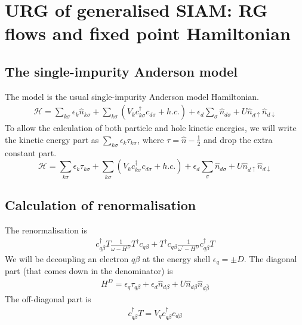 \chapter{URG of generalised SIAM: RG flows and fixed point Hamiltonian}\label{siamurg}
\section{The single-impurity Anderson model}
The model is the usual single-impurity Anderson model Hamiltonian.
\begin{equation}\begin{aligned}
	\label{andham}
	\mathcal{H} = \sum_{k\sigma}\epsilon_k \hat n_{k\sigma} + \sum_{k\sigma} \left(V_{k} c^\dagger_{k\sigma} c_{d\sigma} + h.c.\right) + \epsilon_{d}\sum_\sigma  \hat n_{d\sigma} +  U \hat n_{d\uparrow} \hat n_{d\downarrow}
\end{aligned}\end{equation}
To allow the calculation of both particle and hole kinetic energies, we will write the kinetic energy part as \(\sum_{k\sigma}\epsilon_k \tau_{k\sigma}\), where \(\tau = \hat n - \frac{1}{2}\) and drop the extra constant part.
\begin{equation}
	\label{model:siam}
	\mathcal{H} = \sum_{k\sigma}\epsilon_k \tau_{k\sigma} + \sum_{k\sigma} \left(V_{k} c^\dagger_{k\sigma} c_{d\sigma} + h.c.\right) + \epsilon_{d}\sum_\sigma  \hat n_{d\sigma} +  U \hat n_{d\uparrow} \hat n_{d\downarrow}
\end{equation}
\section{Calculation of renormalisation}
The renormalisation is
\begin{equation}\begin{aligned}
\label{newh}
c^\dagger_{q\beta}T \frac{1}{\omega - H^D}T^\dagger c_{q\beta} + T^\dagger c_{q\beta}\frac{1}{\omega^\prime - H^D}c^\dagger_{q\beta}T
\end{aligned}\end{equation}
We will be decoupling an electron \(q\beta\) at the energy shell \(\epsilon_q = \pm D\). The diagonal part (that comes down in the denominator) is
\begin{equation}\begin{aligned}
	\label{term1}
H^D = \epsilon_q \tau_{q\beta} + \epsilon_{d}\hat n_{d\beta} +  U \hat n_{d\beta} \hat n_{d\bar\beta}
\end{aligned}\end{equation}
The off-diagonal part is
\begin{equation}\begin{aligned}
	c^\dagger_{q\beta}T = V_q c^\dagger_{q\beta}c_{d\beta}
\end{aligned}\end{equation}

